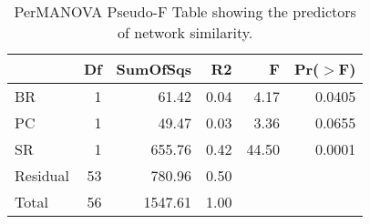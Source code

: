 \begin{table}[ht]
\centering
\begin{tabular}{lrrrrr}
  \hline
 & Df & SumOfSqs & R2 & F & Pr($>$F) \\ 
  \hline
BR & 1 & 61.42 & 0.04 & 4.17 & 0.0405 \\ 
  PC & 1 & 49.47 & 0.03 & 3.36 & 0.0655 \\ 
  SR & 1 & 655.76 & 0.42 & 44.50 & 0.0001 \\ 
  Residual & 53 & 780.96 & 0.50 &  &  \\ 
  Total & 56 & 1547.61 & 1.00 &  &  \\ 
   \hline
\end{tabular}
\caption{PerMANOVA Pseudo-F Table showing the predictors of network similarity.} 
\label{tab:cn_perm_ng}
\end{table}
